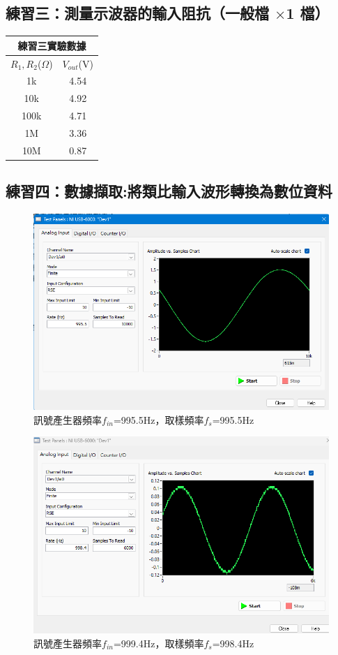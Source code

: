 \documentclass[12pt,a4paper]{article}
\begin{document}
\begin{CJK}{UTF8}{bkai}
\subsection{練習三：測量示波器的輸入阻抗（一般檔 $\times$1 檔）}
\hfill

\begin{center}
\begin{tabular}{c|c}
\multicolumn{2}{c}{練習三實驗數據}\\
\hline
$R_{1}, R_{2}$($\Omega$)    &   $V_{out}$(V)\\
\hline
\hline
1k  &   4.54\\\hline
10k &   4.92\\\hline
100k    &   4.71\\\hline
1M &   3.36\\\hline
10M  &   0.87\\\hline
\end{tabular}
\end{center}

\clearpage

\subsection{練習四：數據擷取:將類比輸入波形轉換為數位資料}
\hfill

\begin{figure}[h]
    \centering
    \includegraphics[width=0.7\linewidth]{figures/1_995_995.png}
    \caption{訊號產生器頻率$f_{in}$=995.5Hz，取樣頻率$f_{s}$=995.5Hz}
    \label{fig:exp_4_1}
\end{figure}

\begin{figure}[h]
    \centering
    \includegraphics[width=0.7\linewidth]{figures/2_999.4_998.4.png}
    \caption{訊號產生器頻率$f_{in}$=999.4Hz，取樣頻率$f_{s}$=998.4Hz}
    \label{fig:exp_4_2}
\end{figure}
\clearpage


\end{CJK}
\end{document}
